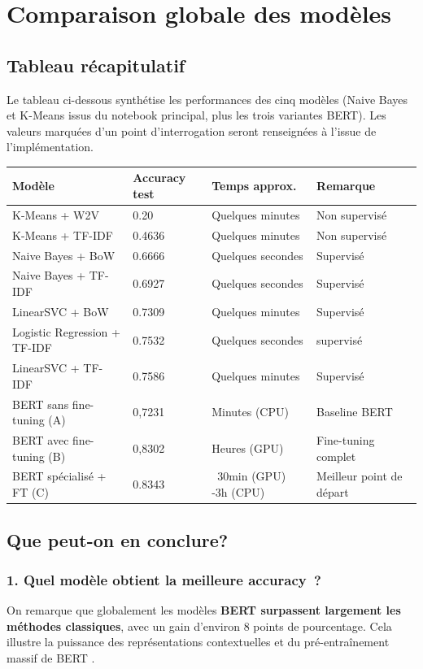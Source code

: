 \documentclass[12pt,a4paper]{article}
\begin{document}
\section{Comparaison globale des modèles}

\subsection{Tableau récapitulatif}

Le tableau ci-dessous synthétise les performances des cinq modèles (Naive Bayes
et K-Means issus du notebook principal, plus les trois variantes BERT). Les valeurs
marquées d'un point d'interrogation seront renseignées à l'issue de l'implémentation.

\begin{center}
\begin{tabular}{@{}L{4cm}C{2.5cm}C{3cm}L{3.5cm}@{}}
  \toprule
  Modèle & Accuracy test & Temps approx. & Remarque \\
  \midrule
  K-Means + W2V & 0.20 & Quelques minutes & Non supervisé \\
  K-Means + TF-IDF & 0.4636 & Quelques minutes & Non supervisé \\
  Naive Bayes + BoW & 0.6666 & Quelques secondes & Supervisé \\
  Naive Bayes + TF-IDF & 0.6927 & Quelques secondes & Supervisé \\
  LinearSVC + BoW & 0.7309 & Quelques minutes & Supervisé \\
  Logistic Regression + TF-IDF & 0.7532 & Quelques secondes & supervisé \\
  LinearSVC + TF-IDF & 0.7586 & Quelques minutes & Supervisé \\
  \midrule
  BERT sans fine-tuning (A) & 0,7231 & Minutes (CPU) & Baseline BERT \\
  BERT avec fine-tuning (B) & 0,8302 & Heures (GPU) & Fine-tuning complet \\
  BERT spécialisé + FT (C) & 0.8343 & ~30min (GPU) -3h (CPU) & Meilleur point de départ \\
  \bottomrule
\end{tabular}
\end{center}


\subsection{Que peut-on en conclure?}

\subsubsection{1. Quel modèle obtient la meilleure accuracy~?}
On remarque que globalement les modèles \textbf{BERT surpassent largement les méthodes classiques}, 
avec un gain d'environ 8 points de pourcentage. Cela illustre la puissance des représentations 
contextuelles et du pré-entraînement massif de BERT .
\end{document}
